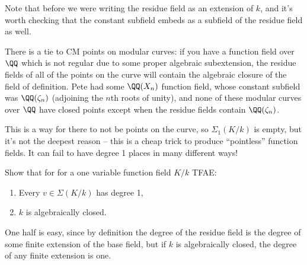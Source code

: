 Note that before we were writing the residue field as an extension of
\(k\), and it's worth checking that the constant subfield embeds as a
subfield of the residue field as well.

\begin{remark}

There is a tie to CM points on modular curves: if you have a function
field over \(\QQ\) which is not regular due to some proper algebraic
subextension, the residue fields of all of the points on the curve will
contain the algebraic closure of the field of definition. Pete had some
\(\QQ(X_n)\) function field, whose constant subfield was
\(\QQ(\zeta_n)\) (adjoining the \(n\)th roots of unity), and none of
these modular curves over \(\QQ\) have closed points except when the
residue fields contain \(\QQ(\zeta_n)\).

\end{remark}

\begin{remark}

This is a way for there to not be points on the curve, so
\(\Sigma_1(K/k)\) is empty, but it's not the deepest reason -- this is a
cheap trick to produce ``pointless'' function fields. It can fail to
have degree 1 places in many different ways!

\end{remark}

\begin{exercise}[?]

Show that for for a one variable function field \(K/k\) TFAE:

\begin{enumerate}
\def\labelenumi{\arabic{enumi}.}
\item
  Every \(v\in \Sigma(K/k)\) has degree 1,
\item
  \(k\) is algebraically closed.
\end{enumerate}

\end{exercise}

\begin{remark}

One half is easy, since by definition the degree of the residue field is
the degree of some finite extension of the base field, but if \(k\) is
algebraically closed, the degree of any finite extension is one.

\end{remark}

